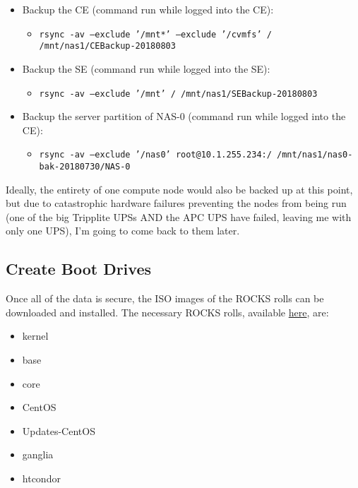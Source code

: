 \documentclass[12pt]{article}
\begin{document}
\begin{itemize}
  \item Backup the CE (command run while logged into the CE):
    \begin{itemize}
    \item {\tt rsync -av --exclude '/mnt*' --exclude '/cvmfs' / /mnt/nas1/CEBackup-20180803}
    \end{itemize}
  \item Backup the SE (command run while logged into the SE):
    \begin{itemize}
    \item {\tt rsync -av --exclude '/mnt' / /mnt/nas1/SEBackup-20180803}
    \end{itemize}
  \item Backup the server partition of NAS-0 (command run while logged into the CE):
    \begin{itemize}
      \item {\tt rsync -av --exclude '/nas0' root@10.1.255.234:/
          /mnt/nas1/nas0-bak-20180730/NAS-0}
      \end{itemize}
\end{itemize}

\qq Ideally, the entirety of one compute node would also be backed up at this
point, but due to catastrophic hardware failures preventing the nodes from being
run (one of the big Tripplite UPSs AND the APC UPS have failed, leaving me with
only one UPS), I'm going to come back to them later.

\subsection{Create Boot Drives}

\qq Once all of the data is secure, the ISO images of the ROCKS rolls can be
downloaded and installed. The necessary ROCKS rolls, available
\href{http://www.rocksclusters.org/downloads/2017-12-01-download-rocks-7-0-manzanita.html
}{here}, are:

\begin{itemize}
  \item kernel
  \item base
  \item core
  \item CentOS
  \item Updates-CentOS
  \item ganglia
  \item htcondor
\end{itemize}
\end{document}
